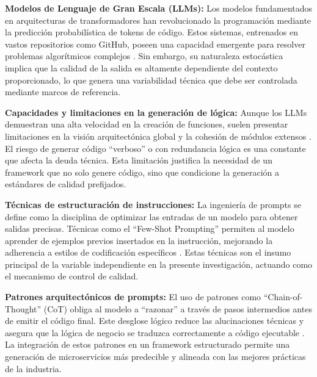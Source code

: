 \begin{listaIV}
\item \textbf{Modelos de Lenguaje de Gran Escala (LLMs):} Los modelos fundamentados en arquitecturas de transformadores han revolucionado la programación mediante la predicción probabilística de tokens de código. Estos sistemas, entrenados en vastos repositorios como GitHub, poseen una capacidad emergente para resolver problemas algorítmicos complejos \cite{hou2024large}. Sin embargo, su naturaleza estocástica implica que la calidad de la salida es altamente dependiente del contexto proporcionado, lo que genera una variabilidad técnica que debe ser controlada mediante marcos de referencia.

\item \textbf{Capacidades y limitaciones en la generación de lógica:} Aunque los LLMs demuestran una alta velocidad en la creación de funciones, suelen presentar limitaciones en la visión arquitectónica global y la cohesión de módulos extensos \cite{azeem2024ai}. El riesgo de generar código ``verboso'' o con redundancia lógica es una constante que afecta la deuda técnica. Esta limitación justifica la necesidad de un framework que no solo genere código, sino que condicione la generación a estándares de calidad prefijados.
\end{listaIV}


\begin{listaIV}
\item \textbf{Técnicas de estructuración de instrucciones:} La ingeniería de prompts se define como la disciplina de optimizar las entradas de un modelo para obtener salidas precisas. Técnicas como el ``Few-Shot Prompting'' permiten al modelo aprender de ejemplos previos insertados en la instrucción, mejorando la adherencia a estilos de codificación específicos \cite{diaz2024optimizacion}. Estas técnicas son el insumo principal de la variable independiente en la presente investigación, actuando como el mecanismo de control de calidad.

\item \textbf{Patrones arquitectónicos de prompts:} El uso de patrones como ``Chain-of-Thought'' (CoT) obliga al modelo a ``razonar'' a través de pasos intermedios antes de emitir el código final. Este desglose lógico reduce las alucinaciones técnicas y asegura que la lógica de negocio se traduzca correctamente a código ejecutable \cite{medianero2024algoritmos}. La integración de estos patrones en un framework estructurado permite una generación de microservicios más predecible y alineada con las mejores prácticas de la industria.
\end{listaIV}

